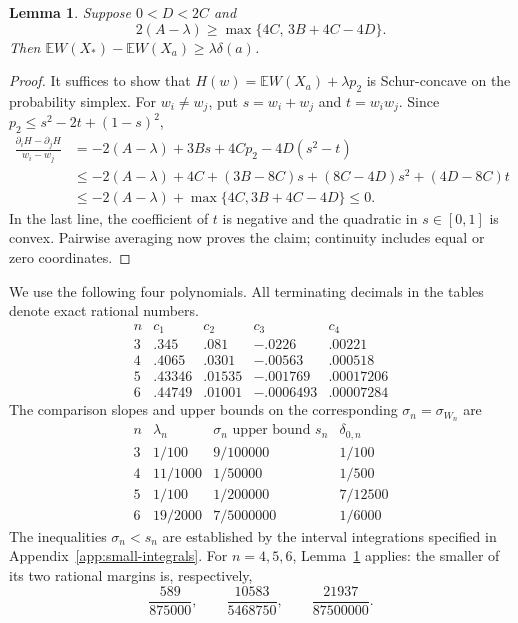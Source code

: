 \documentclass[11pt,a4paper]{article}
\newtheorem{lemma}[theorem]{Lemma}
\theoremstyle{remark}\newtheorem{remark}[theorem]{Remark}
\newcommand{\E}{\mathbb E}
\begin{document}
\begin{lemma}\label{lem:small-schur}
Suppose $0<D<2C$ and
\[
 2(A-\lambda)\ge\max\{4C,\,3B+4C-4D\}.
\]
Then $\E W(X_*)-\E W(X_a)\ge\lambda\delta(a)$.
\end{lemma}
\begin{proof}
It suffices to show that $H(w)=\E W(X_a)+\lambda p_2$ is
Schur-concave on the probability simplex. For $w_i\ne w_j$, put
$s=w_i+w_j$ and $t=w_iw_j$. Since
$p_2\le s^2-2t+(1-s)^2$,
\begin{align*}
 \frac{\partial_iH-\partial_jH}{w_i-w_j}
 &=-2(A-\lambda)+3Bs+4Cp_2-4D(s^2-t)\\
 &\le-2(A-\lambda)+4C+(3B-8C)s+(8C-4D)s^2+(4D-8C)t\\
 &\le-2(A-\lambda)+\max\{4C,3B+4C-4D\}\le0.
\end{align*}
In the last line, the coefficient of $t$ is negative and the quadratic
in $s\in[0,1]$ is convex. Pairwise averaging now proves the claim;
continuity includes equal or zero coordinates.
\end{proof}

We use the following four polynomials. All terminating decimals in the
tables denote exact rational numbers.
\[
\begin{array}{c|rrrr}
 n&c_1&c_2&c_3&c_4\\\hline
 3&.345&.081&-.0226&.00221\\
 4&.4065&.0301&-.00563&.000518\\
 5&.43346&.01535&-.001769&.00017206\\
 6&.44749&.01001&-.0006493&.00007284
\end{array}
\]
The comparison slopes and upper bounds on the corresponding
$\sigma_n=\sigma_{W_n}$ are
\begin{equation}\label{eq:small-parameters}
\begin{array}{c|ccc}
 n&\lambda_n&\sigma_n\text{ upper bound }s_n&\delta_{0,n}\\\hline
 3&1/100&9/100000&1/100\\
 4&11/1000&1/50000&1/500\\
 5&1/100&1/200000&7/12500\\
 6&19/2000&7/5000000&1/6000
\end{array}
\end{equation}
The inequalities $\sigma_n<s_n$ are established by the interval
integrations specified in Appendix~\ref{app:small-integrals}.
For $n=4,5,6$, Lemma~\ref{lem:small-schur} applies: the smaller of
its two rational margins is, respectively,
\[
 \frac{589}{875000},\qquad
 \frac{10583}{5468750},\qquad
 \frac{21937}{87500000}.
\]
\end{document}
